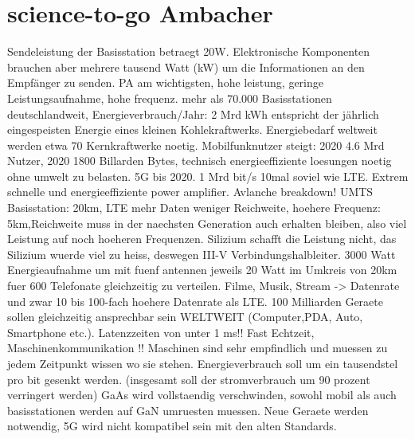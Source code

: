 \chapter*{science-to-go Ambacher}
Sendeleistung der Basisstation betraegt 20W. Elektronische Komponenten brauchen aber mehrere tausend Watt (kW) um die Informationen an den Empfänger zu senden. PA am wichtigsten, hohe leistung, geringe Leistungsaufnahme, hohe frequenz. mehr als 70.000 Basisstationen deutschlandweit, Energieverbrauch/Jahr: 2 Mrd kWh entspricht der jährlich eingespeisten Energie eines kleinen Kohlekraftwerks. Energiebedarf weltweit werden etwa 70 Kernkraftwerke noetig. Mobilfunknutzer steigt: 2020 4.6 Mrd Nutzer, 2020 1800 Billarden Bytes, technisch energieeffiziente loesungen noetig ohne umwelt zu belasten. 5G bis 2020. 1 Mrd bit/s 10mal soviel wie LTE. Extrem schnelle und energieeffiziente power amplifier. Avlanche breakdown! UMTS Basisstation: 20km, LTE mehr Daten weniger Reichweite, hoehere Frequenz: 5km,Reichweite muss in der naechsten Generation auch erhalten bleiben, also viel Leistung auf noch hoeheren Frequenzen. Silizium schafft die Leistung nicht, das Silizium wuerde viel zu heiss, deswegen III-V Verbindungshalbleiter. 3000 Watt Energieaufnahme um mit fuenf antennen jeweils 20 Watt im Umkreis von 20km fuer 600 Telefonate gleichzeitig zu verteilen. Filme, Musik, Stream -> Datenrate und zwar 10 bis 100-fach hoehere Datenrate als LTE. 100 Milliarden Geraete sollen gleichzeitig ansprechbar sein WELTWEIT (Computer,PDA, Auto, Smartphone etc.). Latenzzeiten von unter 1 ms!! Fast Echtzeit, Maschinenkommunikation !! Maschinen sind sehr empfindlich und muessen zu jedem Zeitpunkt wissen wo sie stehen. Energieverbrauch soll um ein tausendstel pro bit gesenkt werden. (insgesamt soll der stromverbrauch um 90 prozent verringert werden) GaAs wird vollstaendig verschwinden, sowohl mobil als auch basisstationen werden auf GaN umruesten muessen. Neue Geraete werden notwendig, 5G wird nicht kompatibel sein mit den alten Standards. 